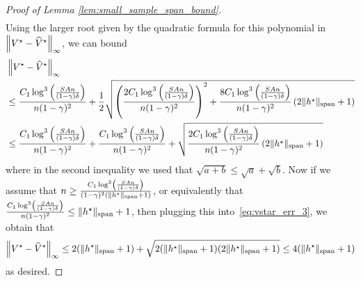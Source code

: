 \documentclass{article}
\theoremstyle{plain}
\theoremstyle{plain}
\theoremstyle{remark}
\theoremstyle{plain}
\theoremstyle{plain}
\newcommand{\Vhat}{\widehat{V}}
\begin{document}
\begin{proof}[Proof of Lemma \ref{lem:small_sample_span_bound}]
\begin{align*}
    \end{align*}
    Using the larger root given by the quadratic formula for this polynomial in $\infnorm{V^\star - \Vhat^\star}$, we can bound
    \begin{align}
        &\infnorm{V^\star - \Vhat^\star} \nonumber\\
        &\leq \frac{C_1  \log^3 \left( \frac{SAn}{(1-\gamma) \delta}\right)}{n(1-\gamma)^2} + \frac{1}{2}\sqrt{\left( \frac{2C_1  \log^3 \left( \frac{SAn}{(1-\gamma) \delta}\right)}{n(1-\gamma)^2} \right)^2 + \frac{8C_1  \log^3 \left( \frac{SAn}{(1-\gamma) \delta}\right)}{n(1-\gamma)^2} \left(2\spannorm{h^{\star}} +1 \right) } \nonumber \\
        &\leq \frac{C_1  \log^3 \left( \frac{SAn}{(1-\gamma) \delta}\right)}{n(1-\gamma)^2} +  \frac{C_1  \log^3 \left( \frac{SAn}{(1-\gamma) \delta}\right)}{n(1-\gamma)^2}  + \sqrt{\frac{2C_1  \log^3 \left( \frac{SAn}{(1-\gamma) \delta}\right)}{n(1-\gamma)^2} \left(2\spannorm{h^{\star}} +1 \right) } \label{eq:vstar_err_3}
    \end{align}
    where in the second inequality we used that $\sqrt{a + b} \leq \sqrt{a} + \sqrt{b}$.
    Now if we assume that $n \geq \frac{C_1  \log^3 \left( \frac{SAn}{(1-\gamma) \delta}\right)}{(1-\gamma)^2 (\Vert h^{\star}\Vert _{\textnormal{span}} +1)}$, or equivalently that $\frac{C_1  \log^3 \left( \frac{SAn}{(1-\gamma) \delta}\right)}{n(1-\gamma)^2} \leq \Vert h^\star\Vert _{\textnormal{span}} + 1$, then plugging this into~\eqref{eq:vstar_err_3}, we obtain that
    \[
        \infnorm{V^\star - \Vhat^\star} \leq 2(\spannorm{h^\star} + 1) + \sqrt{2(\spannorm{h^\star} + 1)(2\spannorm{h^\star} + 1)} \leq 4 (\spannorm{h^\star} + 1)
    \]
    as desired.
\end{proof}
\end{document}
